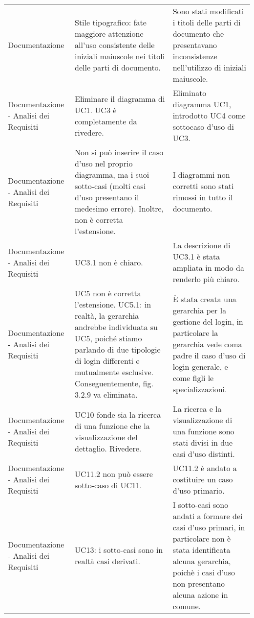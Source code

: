 \begin{longtable}{ 
				>{\centering}p{} 
				>{\centering}p{}
				>{\centering\arraybackslash}p{}}
				Documentazione
					&
				Stile tipografico: fate maggiore attenzione all'uso consistente delle iniziali maiuscole nei titoli delle parti di documento.
					&
				Sono stati modificati i titoli delle parti di documento che presentavano inconsistenze nell'utilizzo di iniziali maiuscole.
					\\
						
				Documentazione - Analisi dei Requisiti
					&
				Eliminare il diagramma di UC1. UC3 è completamente da rivedere.
					&
				Eliminato diagramma UC1, introdotto UC4 come sottocaso d'uso di UC3.   
					\\
			
				Documentazione - Analisi dei Requisiti
					&
				Non si può inserire il caso d'uso\ped{\textit{G}} nel proprio diagramma, ma i suoi sotto-casi (molti casi d'uso\ped{\textit{G}} presentano il medesimo errore). Inoltre, non è corretta l'estensione.
					&
				I diagrammi non corretti sono stati rimossi in tutto il documento. 
					\\
			
				Documentazione - Analisi dei Requisiti
					&
				UC3.1 non è chiaro.
					&
				La descrizione di UC3.1 è stata ampliata in modo da renderlo più chiaro. 
					\\
			
				Documentazione - Analisi dei Requisiti
					&
				UC5 non è corretta l'estensione. UC5.1: in realtà, la gerarchia andrebbe individuata su UC5, poiché stiamo parlando di due tipologie di login differenti e mutualmente esclusive. Conseguentemente, fig. 3.2.9 va eliminata.
					&
				È stata creata una gerarchia per la gestione del login, in particolare la gerarchia vede coma padre il caso d'uso\ped{\textit{G}} di login generale, e come figli le specializzazioni. 
					\\
			
				Documentazione - Analisi dei Requisiti
					&
				UC10 fonde sia la ricerca di una funzione che la visualizzazione del dettaglio. Rivedere.
					&
				La ricerca e la visualizzazione di una funzione sono stati divisi in due casi d'uso\ped{\textit{G}} distinti. 
					\\
			
				Documentazione - Analisi dei Requisiti
					&
				UC11.2 non può essere sotto-caso di UC11.
					&
				UC11.2 è andato a costituire un caso d'uso\ped{\textit{G}} primario. 
					\\
			
				Documentazione - Analisi dei Requisiti
					&
				UC13: i sotto-casi sono in realtà casi derivati.
					&
				I sotto-casi sono andati a formare dei casi d'uso\ped{\textit{G}} primari, in particolare non è stata identificata alcuna gerarchia, poichè i casi d'uso\ped{\textit{G}} non presentano alcuna azione in comune. 
					\\
							

\end{longtable}
